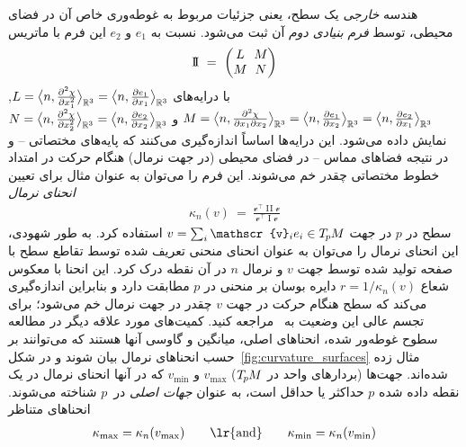 هندسه \emph{خارجی} یک سطح، یعنی جزئیات مربوط به غوطه‌وری خاص آن در فضای محیطی، توسط \emph{فرم بنیادی دوم} آن ثبت می‌شود.
نسبت به $e_1$ و $e_2$ این فرم با ماتریس
\begin{align}
    \operatorname{I\!I}
    \ =\ 
    \begin{pmatrix}
        L \mkern-8mu& M \\
        M \mkern-8mu& N
    \end{pmatrix}
\end{align}
با درایه‌های
$L = \big\langle n, \frac{\partial^2\chi}{\partial x_1^2} \big\rangle_{\mathbb{R}^3}
    = \big\langle n, \frac{\partial e_1}{\partial x_1} \big\rangle_{\mathbb{R}^3}$,
$M = \big\langle n, \frac{\partial^2\chi}{\partial x_1 \partial x_2} \big\rangle_{\mathbb{R}^3}
    = \big\langle n, \frac{\partial e_1}{\partial x_2} \big\rangle_{\mathbb{R}^3}
    = \big\langle n, \frac{\partial e_2}{\partial x_1} \big\rangle_{\mathbb{R}^3}$
و
$N = \big\langle n, \frac{\partial^2\chi}{\partial x_2^2} \big\rangle_{\mathbb{R}^3}
    = \big\langle n, \frac{\partial e_2}{\partial x_2} \big\rangle_{\mathbb{R}^3}$ نمایش داده می‌شود.
این درایه‌ها اساساً اندازه‌گیری می‌کنند که پایه‌های مختصاتی -- و در نتیجه فضاهای مماس -- در فضای محیطی (در جهت نرمال) هنگام حرکت در امتداد خطوط مختصاتی چقدر خم می‌شوند.
این فرم را می‌توان به عنوان مثال برای تعیین \emph{انحنای نرمال}
\begin{align}
    \kappa_n(v)\ =\ \frac{\mathscr{v}^\top \operatorname{I\!I}\mathscr{v}}{\mathscr{v}^\top \operatorname{I}\mathscr{v}}
\end{align}
سطح در $p$ در جهت $v = \sum_i \mathscr{v}_i e_i \in \TpM$ استفاده کرد.
به طور شهودی، این انحنای نرمال را می‌توان به عنوان انحنای منحنی تعریف شده توسط تقاطع سطح با صفحه تولید شده توسط جهت $v$ و نرمال $n$ در آن نقطه درک کرد.
این انحنا با معکوس شعاع $r=1/\kappa_n(v)$ دایره بوسان بر منحنی در $p$ مطابقت دارد و بنابراین اندازه‌گیری می‌کند که سطح هنگام حرکت در جهت $v$ چقدر در جهت نرمال خم می‌شود؛ برای تجسم عالی این وضعیت به~\cite{craneDiscreteDifferentialGeometry2014} مراجعه کنید.
کمیت‌های مورد علاقه دیگر در مطالعه سطوح غوطه‌ور شده، انحناهای اصلی، میانگین و گاوسی آنها هستند که می‌توانند بر حسب انحناهای نرمال بیان شوند و در شکل~\ref{fig:curvature_surfaces} مثال زده شده‌اند.
جهت‌ها (بردارهای واحد در $T_{\mkern-1.5mu p}\mkern-.5muM$) $v_{\max}$ و $v_{\min}$ که در آنها انحنای نرمال در یک نقطه داده شده $p$ حداکثر یا حداقل است، به عنوان \emph{جهات اصلی} در~$p$ شناخته می‌شوند.
انحناهای متناظر
\begin{align}
    \kappa_{\max} = \kappa_n(v_{\max})
    \qquad \textup{\lr{and}} \qquad
    \kappa_{\min} = \kappa_n(v_{\min})
\end{align}
